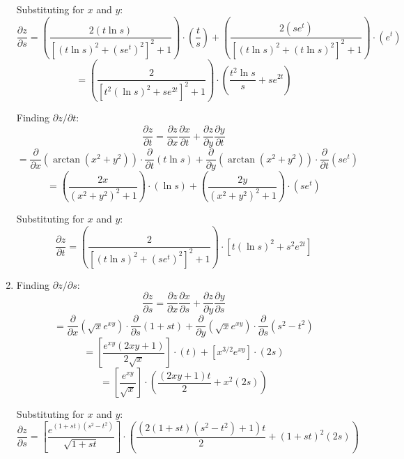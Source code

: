 \begin{Answer}[ref = chain]
\begin{enumerate}
    Substituting for $x$ and $y$: 
    $$\frac{\partial z}{\partial s} = \left( \frac{2 \left( t \ln{s} \right)}{
    \left[ \left( t\ln{s} \right)^2 + \left( se^t \right)^2 \right]^2 + 1} 
    \right) \cdot \left( \frac{t}{s} \right) + \left( \frac{2 \left( se^t 
    \right)}{\left[ \left( t\ln{s} \right)^2 + \left( t\ln{s} \right)^2 
    \right]^2 + 1} \right) \cdot \left( e^t \right)$$
    $$= \left( \frac{2}{\left[ t^2 \left( \ln{s} \right)^2 + se^{2t} \right]^2 
    + 1} \right) \cdot \left( \frac{t^2 \ln{s}}{s} + se^{2t} \right)$$

    Finding $\partial z / \partial t$:
    $$\frac{\partial z}{\partial t} = \frac{\partial z}{\partial x} \frac{
    \partial x}{\partial t} + \frac{\partial z}{\partial y} \frac{\partial y}{
    \partial t}$$
    $$= \frac{\partial}{\partial x} \left( \arctan{ \left( x^2 + y^2 \right)} 
    \right) \cdot \frac{\partial}{\partial t} \left( t \ln{s} \right) + \frac{
    \partial}{\partial y} \left( \arctan{ \left( x^2 + y^2 \right)} \right) 
    \cdot \frac{\partial}{\partial t} \left( se^t \right)$$
    $$= \left( \frac{2x}{\left( x^2 + y^2 \right)^2 + 1} \right) \cdot \left( 
    \ln{s} \right) + \left( \frac{2y}{\left( x^2 + y^2 \right)^2 + 1} \right) 
    \cdot \left( se^t \right)$$

    Substituting for $x$ and $y$:
    $$\frac{\partial z}{\partial t} = \left( \frac{2}{\left[ \left( t\ln{s} 
    \right)^2 + \left( se^t \right)^2 \right]^2 + 1} \right) \cdot \left[ t 
    \left( \ln{s} \right)^2 + s^2e^{2t} \right]$$

    \item Finding $\partial z / \partial s$:
    $$\frac{\partial z}{\partial s} = \frac{\partial z}{\partial x} \frac{
    \partial x}{\partial s} + \frac{\partial z}{\partial y} \frac{\partial y}{
    \partial s}$$
    $$= \frac{\partial}{\partial x} \left( \sqrt{x}e^{xy} \right) \cdot \frac{
    \partial}{\partial s} \left( 1 + st \right) + \frac{\partial}{\partial y} 
    \left( \sqrt{x}e^{xy} \right) \cdot \frac{\partial}{\partial s} \left( s^2 
    - t^2 \right)$$
    $$= \left[ \frac{e^{xy} \left( 2xy + 1 \right)}{2\sqrt{x}} \right] \cdot 
    \left( t \right) + \left[ x^{3/2}e^{xy} \right] \cdot \left( 2s \right)$$
    $$= \left[ \frac{e^{xy}}{\sqrt{x}} \right] \cdot \left( \frac{\left(2xy + 
    1 \right)t}{2} + x^2 \left( 2s \right) \right)$$

    Substituting for $x$ and $y$:
    $$\frac{\partial z}{\partial s} = \left[ \frac{e^{(1 + st)(s^2 - t^2)}}{
    \sqrt{1 + st}} \right] \cdot \left( \frac{\left( 2(1 + st)(s^2 - t^2) + 1 
    \right)t }{2} + \left( 1 + st \right)^2 \left( 2s \right) \right)$$


\end{enumerate}
\end{Answer}
